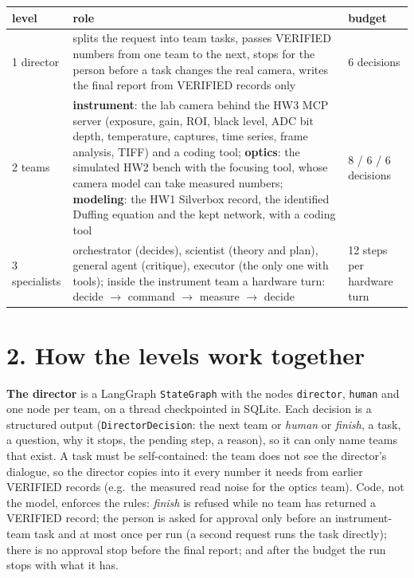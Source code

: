 \documentclass[11pt,a4paper]{article}
\begin{document}
\begin{center}\small
\begin{tabularx}{\linewidth}{@{}lXl@{}}
\toprule
level & role & budget\\ \midrule
1 director & splits the request into team tasks, passes VERIFIED numbers from one team to the next, stops for the
  person before a task changes the real camera, writes the final report from VERIFIED records only & 6 decisions\\
2 teams & \textbf{instrument}: the lab camera behind the HW3 MCP server (exposure, gain, ROI, black level, ADC bit
  depth, temperature, captures, time series, frame analysis, TIFF) and a coding tool; \textbf{optics}: the simulated
  HW2 bench with the focusing tool, whose camera model can take measured numbers; \textbf{modeling}: the HW1 Silverbox
  record, the identified Duffing equation and the kept network, with a coding tool &
  8 / 6 / 6 decisions\\
3 specialists & orchestrator (decides), scientist (theory and plan), general agent (critique), executor (the only one
  with tools); inside the instrument team a hardware turn: decide $\to$ command $\to$ measure $\to$ decide &
  12 steps per hardware turn\\
\bottomrule
\end{tabularx}
\end{center}

\section*{2. How the levels work together}
\textbf{The director} is a LangGraph \texttt{StateGraph} with the nodes \texttt{director}, \texttt{human} and one node per
team, on a thread checkpointed in SQLite. Each decision is a structured output (\texttt{DirectorDecision}: the next team
or \emph{human} or \emph{finish}, a task, a question, why it stops, the pending step, a reason), so it can only name
teams that exist. A task must be self-contained: the team does not see the director's dialogue, so the director copies
into it every number it needs from earlier VERIFIED records (e.g.\ the measured read noise for the optics team). Code,
not the model, enforces the rules: \emph{finish} is refused while no team has returned a VERIFIED record; the person is
asked for approval only before an instrument-team task and at most once per run (a second request runs the task
directly); there is no approval stop before the final report; and after the budget the run stops with what it has.
\end{document}
